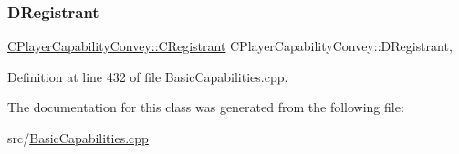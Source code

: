 \subsubsection{\texorpdfstring{D\+Registrant}{DRegistrant}}
{\footnotesize\ttfamily \hyperlink{classCPlayerCapabilityConvey_1_1CRegistrant}{C\+Player\+Capability\+Convey\+::\+C\+Registrant} C\+Player\+Capability\+Convey\+::\+D\+Registrant\hspace{0.3cm}{\ttfamily [static]}, {\ttfamily [protected]}}



Definition at line 432 of file Basic\+Capabilities.\+cpp.



The documentation for this class was generated from the following file\+:\begin{DoxyCompactItemize}
\item 
src/\hyperlink{BasicCapabilities_8cpp}{Basic\+Capabilities.\+cpp}\end{DoxyCompactItemize}
